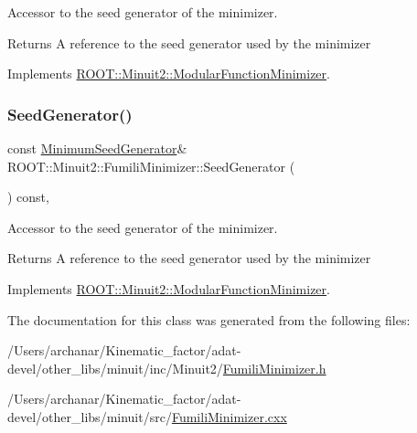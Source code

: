 Accessor to the seed generator of the minimizer.

\begin{DoxyReturn}{Returns}
A reference to the seed generator used by the minimizer 
\end{DoxyReturn}


Implements \mbox{\hyperlink{classROOT_1_1Minuit2_1_1ModularFunctionMinimizer_a742930de97b0ce9ba23773874ae0894b}{R\+O\+O\+T\+::\+Minuit2\+::\+Modular\+Function\+Minimizer}}.

\mbox{\label{classROOT_1_1Minuit2_1_1FumiliMinimizer_ad8906dbac7f0c20284e361be606d5634}} 
\subsubsection{\texorpdfstring{SeedGenerator()}{SeedGenerator()}\hspace{0.1cm}{\footnotesize\ttfamily [3/3]}}
{\footnotesize\ttfamily const \mbox{\hyperlink{classROOT_1_1Minuit2_1_1MinimumSeedGenerator}{Minimum\+Seed\+Generator}}\& R\+O\+O\+T\+::\+Minuit2\+::\+Fumili\+Minimizer\+::\+Seed\+Generator (\begin{DoxyParamCaption}{ }\end{DoxyParamCaption}) const\hspace{0.3cm}{\ttfamily [inline]}, {\ttfamily [virtual]}}

Accessor to the seed generator of the minimizer.

\begin{DoxyReturn}{Returns}
A reference to the seed generator used by the minimizer 
\end{DoxyReturn}


Implements \mbox{\hyperlink{classROOT_1_1Minuit2_1_1ModularFunctionMinimizer_a742930de97b0ce9ba23773874ae0894b}{R\+O\+O\+T\+::\+Minuit2\+::\+Modular\+Function\+Minimizer}}.



The documentation for this class was generated from the following files\+:\begin{DoxyCompactItemize}
\item 
/\+Users/archanar/\+Kinematic\+\_\+factor/adat-\/devel/other\+\_\+libs/minuit/inc/\+Minuit2/\mbox{\hyperlink{adat-devel_2other__libs_2minuit_2inc_2Minuit2_2FumiliMinimizer_8h}{Fumili\+Minimizer.\+h}}\item 
/\+Users/archanar/\+Kinematic\+\_\+factor/adat-\/devel/other\+\_\+libs/minuit/src/\mbox{\hyperlink{adat-devel_2other__libs_2minuit_2src_2FumiliMinimizer_8cxx}{Fumili\+Minimizer.\+cxx}}\end{DoxyCompactItemize}
